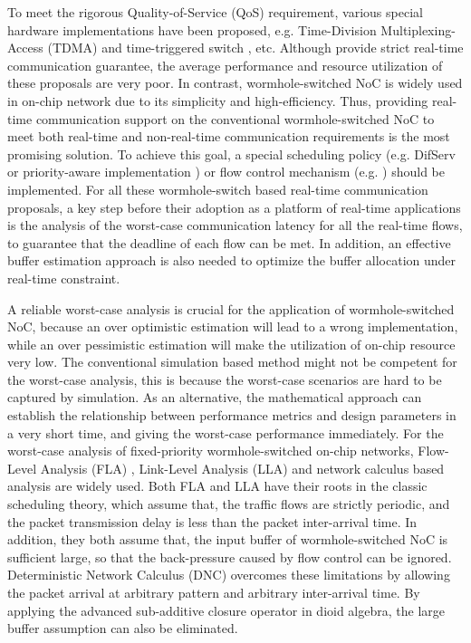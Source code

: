 \documentclass[10pt,journal]{IEEEtran}
\begin{document}
To meet the rigorous Quality-of-Service (QoS) requirement, various special hardware implementations have been proposed, e.g. Time-Division Multiplexing-Access (TDMA) \cite{GoDR05} and time-triggered switch \cite{4617280}, etc. Although provide strict real-time communication guarantee, the average performance and resource utilization of these proposals are very poor. In contrast, wormhole-switched NoC is widely used in on-chip network due to its simplicity and high-efficiency. Thus, providing real-time communication support on the conventional wormhole-switched NoC to meet both real-time and non-real-time communication requirements is the most promising solution. To achieve this goal, a special scheduling policy (e.g. DifServ \cite{1411140} or priority-aware implementation \cite{Shi:2008:RCA:1397757.1397996}\cite{708526}\cite{627905}) or flow control mechanism (e.g. \cite{Li199649}\cite{707545}) should be implemented. For all these wormhole-switch based real-time communication proposals, a key step before their adoption as a platform of real-time applications is the analysis of the worst-case communication latency for all the real-time flows, to guarantee that the deadline of each flow can be met. In addition, an effective buffer estimation approach is also needed to optimize the buffer allocation under real-time constraint.

A reliable worst-case analysis is crucial for the application of wormhole-switched NoC, because an over optimistic estimation will lead to a wrong implementation, while an over pessimistic estimation will make the utilization of on-chip resource very low. The conventional simulation based method might not be competent for the worst-case analysis, this is because the worst-case scenarios are hard to be captured by simulation. As an alternative, the mathematical approach can establish the relationship between performance metrics and design parameters in a very short time, and giving the worst-case performance immediately. For the worst-case analysis of fixed-priority wormhole-switched on-chip networks, Flow-Level Analysis (FLA) \cite{Shi:2008:RCA:1397757.1397996}, Link-Level Analysis (LLA) \cite{73}\cite{189} and network calculus \cite{Qian489900} based analysis are widely used. Both FLA and LLA have their roots in the classic scheduling theory, which assume that, the traffic flows are strictly periodic, and the packet transmission delay is less than the packet inter-arrival time. In addition, they both assume that, the input buffer of wormhole-switched NoC is sufficient large, so that the back-pressure caused by flow control can be ignored. Deterministic Network Calculus (DNC) overcomes these limitations by allowing the packet arrival at arbitrary pattern and arbitrary inter-arrival time. By applying the advanced sub-additive closure operator in dioid algebra, the large buffer assumption can also be eliminated.
\end{document}
